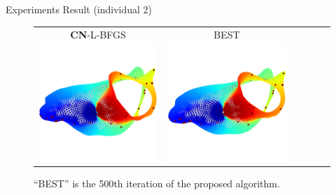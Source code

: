\documentclass[dvipdfmx,13pt,aspectratio=169]{beamer}
\begin{document}
\begin{frame}{Experiments Result (individual 2)}
\begin{figure}[h]
\begin{tabular}{cccccc}
        \makecell{\small{\textsf{\textbf{CN}-L-BFGS}}                                                                                                        \\[-0.2em]\includegraphics[width=0.135\columnwidth]{../main/individual/vis/3elt_CN-L-BFGS.png}} &
        \makecell{\small{\textsf{BEST}}                                                                                                                      \\[-0.2em]\includegraphics[width=0.135\columnwidth]{../main/individual/vis/opt_3elt.png}} \\
      \end{tabular}
      \caption{``BEST'' is the 500th iteration of the proposed algorithm.}
    \end{figure}
  \end{frame}
\fi
\end{document}
